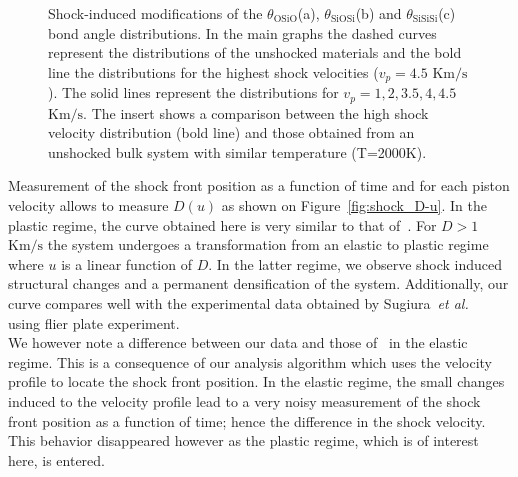 \documentclass[aps,10pt,twocolumn]{revtex4}
\makeatletter
\newcommand{\etal}{\emph{et al.}\@\xspace}
\newcommand{\mrm}[1]{\ensuremath{\mathrm{#1}}\xspace}
\newlength{\picW}	%
\newcommand{\picA}{270}	%
\newcommand{\picL}[1]{\texttt{[image: \#1]}}
\makeatother
\begin{document}


\picW=8cm
\begin{figure}
\subfigure[]{\picL{fig06a.ps}}
\subfigure[]{\picL{fig06b.ps}}
\subfigure[]{\picL{fig06c.ps}}
\caption{Shock-induced modifications of the $\theta_\mrm{OSiO}$(a), $\theta_\mrm{SiOSi}$(b) and
$\theta_\mrm{SiSiSi}$(c) bond angle
distributions. In the main graphs the dashed curves represent the distributions of the
unshocked materials and the bold line the distributions for the highest shock velocities
($v_p=4.5$ \mrm{ Km/s}). 
The solid lines represent the distributions for 
$v_p = 1,2,3.5,4,4.5$  \mrm{Km/s}.
The insert shows a comparison between the high shock velocity distribution (bold line) and those
obtained from an unshocked bulk system with similar temperature (T=2000K). }
\label{fig:shock_BAD}
\end{figure}


Measurement of the shock front position as a function of time and for each piston velocity allows
to measure $D(u)$ as shown on Figure~\ref{fig:shock_D-u}.
In the plastic regime, the curve obtained here is very similar to that
of~\cite{KubotaCaturla03}. For $D>1$ \mrm{Km/s} the system undergoes a transformation from
an elastic to plastic regime where $u$ is a linear function of $D$. In the latter regime, we
observe shock induced structural changes and a permanent densification of the system.
Additionally, our curve compares well with the experimental data obtained by
Sugiura~\etal~\cite{SugiuraKondo81} using flier plate experiment.\\
We however note a difference between our data and those of~\cite{KubotaCaturla03} in the elastic
regime. This is a consequence of our analysis algorithm which uses the velocity 
profile to locate the shock front position. In the elastic regime, the small changes induced to
the velocity profile lead to a very noisy measurement of the shock front position as a function
of time; hence the difference in the shock velocity. This behavior disappeared however as
the plastic regime, which is of interest here, is entered.\\ 
\end{document}
